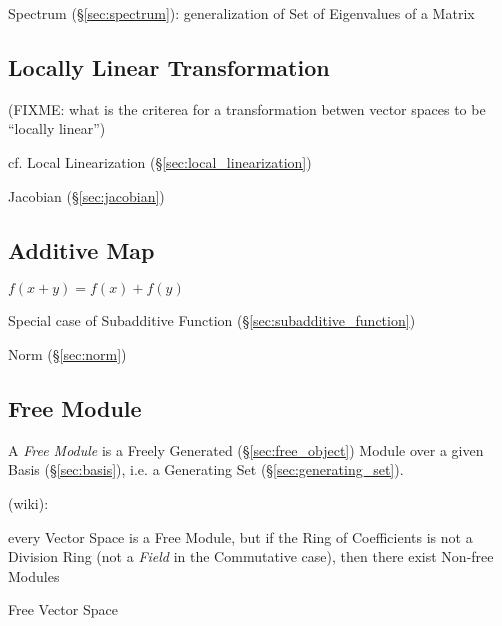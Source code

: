 \fist Spectrum (\S\ref{sec:spectrum}): generalization of Set of Eigenvalues of
a Matrix



\subsection{Locally Linear Transformation}\label{sec:locally_linear}


(FIXME: what is the criterea for a transformation betwen vector spaces to be
``locally linear'')

\fist cf. Local Linearization (\S\ref{sec:local_linearization})

\fist Jacobian (\S\ref{sec:jacobian})



\subsection{Additive Map}\label{sec:additive_map}

$f(x + y) = f(x) + f(y)$

Special case of Subadditive Function (\S\ref{sec:subadditive_function})

Norm (\S\ref{sec:norm})



\subsection{Free Module}\label{sec:free_module}

A \emph{Free Module} is a Freely Generated (\S\ref{sec:free_object}) Module
over a given Basis (\S\ref{sec:basis}), i.e. a Generating Set
(\S\ref{sec:generating_set}).

(wiki):

every Vector Space is a Free Module, but if the Ring of Coefficients is not a
Division Ring (not a \emph{Field} in the Commutative case), then there exist
Non-free Modules

Free Vector Space



